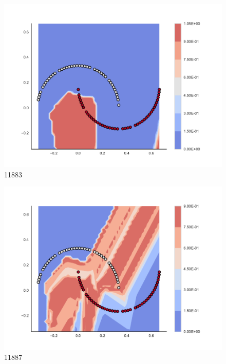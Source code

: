 \begin{subfigure}[b]{0.09\textwidth}
    \includegraphics[width=\textwidth]{img/convergence/11883.pdf}
    \caption{11883}
    \label{fig:convergence_11883}
\end{subfigure}
%
\begin{subfigure}[b]{0.09\textwidth}
    \includegraphics[width=\textwidth]{img/convergence/11887.pdf}
    \caption{11887}
    \label{fig:convergence_11887}
\end{subfigure}
%
